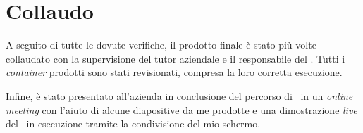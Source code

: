 \section{Collaudo}

A seguito di tutte le dovute verifiche, il prodotto finale è stato più volte collaudato con la supervisione del tutor aziendale e il responsabile del .
Tutti i \textit{container} prodotti sono stati revisionati, compresa la loro corretta esecuzione.

Infine, è stato presentato all'azienda in conclusione del percorso di \stage\ in un \textit{online meeting} con l'aiuto di alcune diapositive da me prodotte e una dimostrazione \textit{live} del \software\ in esecuzione tramite la condivisione del mio schermo.
